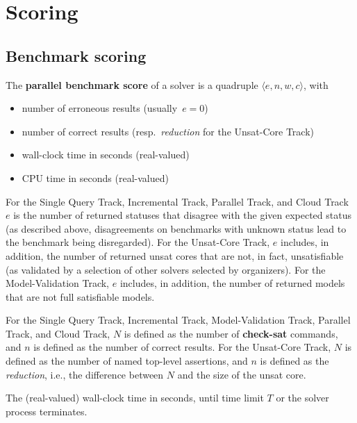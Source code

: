 \documentclass[12pt]{article}
\newcommand{\akey}[1]{\textbf{#1}\xspace}
\newcommand{\maintrack}{Single Query Track\xspace}
\newcommand{\inctrack}{Incremental Track\xspace}
\newcommand{\ucoretrack}{Unsat-Core Track\xspace}
\newcommand{\mvaltrack}{Model-Validation Track\xspace}
\newcommand{\paralleltrack}{Parallel Track\xspace}
\newcommand{\cloudtrack}{Cloud Track\xspace}
\begin{document}
\section{Scoring}
\label{sec:scoring}

\subsection{Benchmark scoring}
\label{sec:benchmark-scoring}

The \textbf{parallel benchmark score} of a solver is a quadruple $\langle
e, n, w, c\rangle$, with
\begin{itemize}[noitemsep]
  \vspace{-1ex}
  \item {}
    number of erroneous results (usually~$e = 0$)
  \item {}
    number of correct results (resp.~\emph{reduction} for the \ucoretrack)
  \item {}
    wall-clock time in seconds (real-valued)
  \item {}
    CPU time in seconds (real-valued)
\end{itemize}

For the \maintrack, \inctrack, \paralleltrack, and \cloudtrack
$e$ is the number of returned
statuses that disagree with the given expected status (as described above,
disagreements on benchmarks with unknown status lead to the benchmark being
disregarded). For the \ucoretrack, $e$ includes, in addition, the number of
returned unsat cores that are not, in fact, unsatisfiable (as
validated by a selection of other solvers selected by organizers).  For the
\mvaltrack, $e$ includes, in addition, the number of returned models that are
not full satisfiable models.

For the \maintrack, \inctrack, \mvaltrack, \paralleltrack, and
\cloudtrack,
$N$ is defined as the number of \akey{check-sat} commands, and
$n$ is defined as the number of correct results.
For the \ucoretrack, $N$ is defined as the number of named top-level assertions,
and $n$ is defined as the \emph{reduction}, i.e., the difference between $N$
and the size of the unsat core.

The (real-valued) wall-clock time in seconds, until time limit $T$ or the
solver process terminates.
\end{document}
